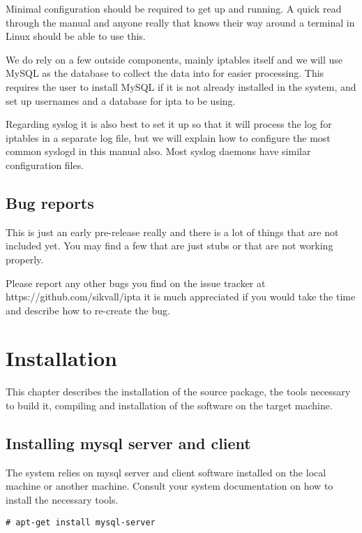 \documentclass[english,twoside,openright,a4paper,12pt]{article}
\begin{document}
Minimal configuration should be required to get up and running. A
quick read through the manual and anyone really that knows their way
around a terminal in Linux should be able to use this.

We do rely on a few outside components, mainly iptables itself and we
will use MySQL as the database to collect the data into for easier
processing. This requires the user to install MySQL if it is not
already installed in the system, and set up usernames and a database
for ipta to be using.

Regarding syslog it is also best to set it up so that it will process 
the log for iptables in a separate log file, but we will explain how 
to configure the most common syslogd in this manual also. Most syslog 
daemons have similar configuration files.

\subsection{Bug reports}

This is just an early pre-release really and there is a lot of things
that are not included yet. You may find a few that are just stubs or
that are not working properly.

Please report any other bugs you find on the issue tracker
at\\ https://github.com/sikvall/ipta it is much appreciated if you
would take the time and describe how to re-create the bug.
 

\section{Installation}

This chapter describes the installation of the source package, the
tools necessary to build it, compiling and installation of the
software on the target machine.

\subsection{Installing mysql server and client}

The system relies on mysql server and client software installed on the
local machine or another machine. Consult your system documentation on
how to install the necessary tools.

\begin{verbatim}
# apt-get install mysql-server
\end{verbatim}
\end{document}
